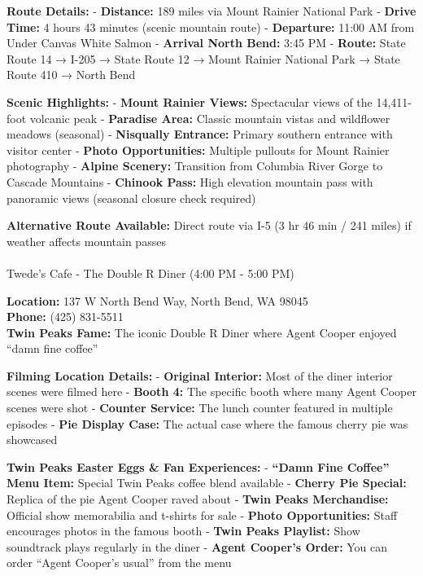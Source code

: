 \documentclass[
  11pt,
  letterpaper,
  DIV=10,
  numbers=noendperiod]{scrartcl}
\makeatletter
\let\oldparagraph\paragraph
\renewcommand{\paragraph}{
    \@ifstar
      \xxxParagraphStar
      \xxxParagraphNoStar
  }
\newcommand{\xxxParagraphStar}[1]{\oldparagraph*{#1}\mbox{}}
\newcommand{\xxxParagraphNoStar}[1]{\oldparagraph{#1}\mbox{}}
\makeatother
\begin{document}
\textbf{Route Details:} - \textbf{Distance:} 189 miles via Mount Rainier
National Park - \textbf{Drive Time:} 4 hours 43 minutes (scenic mountain
route) - \textbf{Departure:} 11:00 AM from Under Canvas White Salmon -
\textbf{Arrival North Bend:} 3:45 PM - \textbf{Route:} State Route 14 →
I-205 → State Route 12 → Mount Rainier National Park → State Route 410 →
North Bend

\textbf{Scenic Highlights:} - \textbf{Mount Rainier Views:} Spectacular
views of the 14,411-foot volcanic peak - \textbf{Paradise Area:} Classic
mountain vistas and wildflower meadows (seasonal) - \textbf{Nisqually
Entrance:} Primary southern entrance with visitor center - \textbf{Photo
Opportunities:} Multiple pullouts for Mount Rainier photography -
\textbf{Alpine Scenery:} Transition from Columbia River Gorge to Cascade
Mountains - \textbf{Chinook Pass:} High elevation mountain pass with
panoramic views (seasonal closure check required)

\textbf{Alternative Route Available:} Direct route via I-5 (3 hr 46 min
/ 241 miles) if weather affects mountain passes

\paragraph{Twede's Cafe - The Double R Diner (4:00 PM - 5:00
PM)}\label{twedes-cafe---the-double-r-diner-400-pm---500-pm}

\textbf{Location:} 137 W North Bend Way, North Bend, WA 98045\\
\textbf{Phone:} (425) 831-5511\\
\textbf{Twin Peaks Fame:} The iconic Double R Diner where Agent Cooper
enjoyed ``damn fine coffee''

\textbf{Filming Location Details:} - \textbf{Original Interior:} Most of
the diner interior scenes were filmed here - \textbf{Booth 4:} The
specific booth where many Agent Cooper scenes were shot -
\textbf{Counter Service:} The lunch counter featured in multiple
episodes - \textbf{Pie Display Case:} The actual case where the famous
cherry pie was showcased

\textbf{Twin Peaks Easter Eggs \& Fan Experiences:} - \textbf{``Damn
Fine Coffee'' Menu Item:} Special Twin Peaks coffee blend available -
\textbf{Cherry Pie Special:} Replica of the pie Agent Cooper raved about
- \textbf{Twin Peaks Merchandise:} Official show memorabilia and
t-shirts for sale - \textbf{Photo Opportunities:} Staff encourages
photos in the famous booth - \textbf{Twin Peaks Playlist:} Show
soundtrack plays regularly in the diner - \textbf{Agent Cooper's Order:}
You can order ``Agent Cooper's usual'' from the menu
\end{document}
